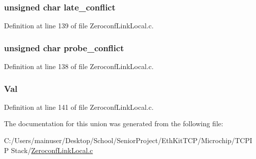 \subsubsection[{late\+\_\+conflict}]{\setlength{\rightskip}{0pt plus 5cm}unsigned char late\+\_\+conflict}\label{union___z_c_l_l___f_l_a_g_s_a27d528dc16aa3432087922054b03ddd1}


Definition at line 139 of file Zeroconf\+Link\+Local.\+c.

\hypertarget{union___z_c_l_l___f_l_a_g_s_adaafea479c46630855a27328c443ada2}{}
\subsubsection[{probe\+\_\+conflict}]{\setlength{\rightskip}{0pt plus 5cm}unsigned char probe\+\_\+conflict}\label{union___z_c_l_l___f_l_a_g_s_adaafea479c46630855a27328c443ada2}


Definition at line 138 of file Zeroconf\+Link\+Local.\+c.

\hypertarget{union___z_c_l_l___f_l_a_g_s_a5ab8c2bf45b20b5f7aa3a4f083896cec}{}
\subsubsection[{Val}]{ Val}\label{union___z_c_l_l___f_l_a_g_s_a5ab8c2bf45b20b5f7aa3a4f083896cec}


Definition at line 141 of file Zeroconf\+Link\+Local.\+c.



The documentation for this union was generated from the following file\+:\begin{DoxyCompactItemize}
\item 
C\+:/\+Users/mainuser/\+Desktop/\+School/\+Senior\+Project/\+Eth\+Kit\+T\+C\+P/\+Microchip/\+T\+C\+P\+I\+P Stack/\hyperlink{_zeroconf_link_local_8c}{Zeroconf\+Link\+Local.\+c}\end{DoxyCompactItemize}
